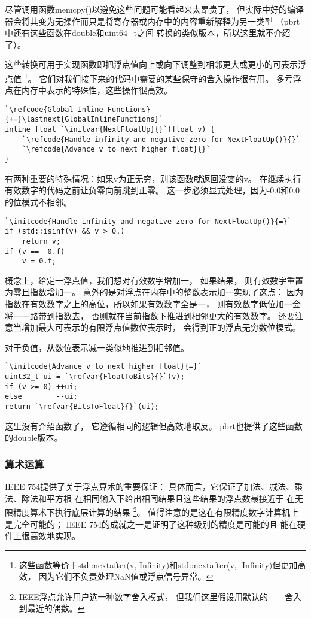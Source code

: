 尽管调用函数{\ttfamily memcpy()}以避免这些问题可能看起来太昂贵了，
但实际中好的编译器会将其变为无操作而只是将寄存器或内存中的内容重新解释为另一类型
（pbrt中还有这些函数在{\ttfamily double}和{\ttfamily uint64\_t}之间
转换的类似版本，所以这里就不介绍了）。

这些转换可用于实现函数即把浮点值向上或向下调整到相邻更大或更小的可表示浮点值
\footnote{这些函数等价于{\ttfamily std::nextafter(v, Infinity)}和{\ttfamily std::nextafter(v, -Infinity)}但更加高效，
因为它们不负责处理NaN值或浮点信号异常。}。
它们对我们接下来的代码中需要的某些保守的舍入操作很有用。
多亏浮点在内存中表示的特殊性，这些操作很高效。
\begin{lstlisting}
`\refcode{Global Inline Functions}{+=}\lastnext{GlobalInlineFunctions}`
inline float `\initvar{NextFloatUp}{}`(float v) {
    `\refcode{Handle infinity and negative zero for NextFloatUp()}{}`
    `\refcode{Advance v to next higher float}{}`
}
\end{lstlisting}

有两种重要的特殊情况：如果{\ttfamily v}为正无穷，则该函数就返回没变的{\ttfamily v}。
在继续执行有效数字的代码之前让负零向前跳到正零。
这一步必须显式处理，因为-0.0和0.0的位模式不相邻。
\begin{lstlisting}
`\initcode{Handle infinity and negative zero for NextFloatUp()}{=}`
if (std::isinf(v) && v > 0.)
    return v;
if (v == -0.f)
    v = 0.f;
\end{lstlisting}

概念上，给定一浮点值，我们想对有效数字增加一，
如果结果，
则有效数字重置为零且指数增加一。
意外的是对浮点在内存中的整数表示加一实现了这点：
因为指数在有效数字之上的高位，所以如果有效数字全是一，
则有效数字低位加一会将一一路带到指数去，
否则就在当前指数下推进到相邻更大的有效数字。
还要注意当增加最大可表示的有限浮点值数位表示时，
会得到正的浮点无穷数位模式。

对于负值，从数位表示减一类似地推进到相邻值。
\begin{lstlisting}
`\initcode{Advance v to next higher float}{=}`
uint32_t ui = `\refvar{FloatToBits}{}`(v);
if (v >= 0) ++ui;
else        --ui;
return `\refvar{BitsToFloat}{}`(ui);
\end{lstlisting}

这里没有介绍函数{}了，
它遵循相同的逻辑但高效地取反。
pbrt也提供了这些函数的{\ttfamily double}版本。

\subsubsection*{算术运算}
IEEE 754提供了关于浮点算术的重要保证：
具体而言，它保证了加法、减法、乘法、除法和平方根
在相同输入下给出相同结果且这些结果的浮点数最接近于
在无限精度算术下执行底层计算的结果
\footnote{IEEE浮点允许用户选一种数字舍入模式，
    但我们这里假设用默认的——舍入到最近的偶数。}。
值得注意的是这在有限精度数字计算机上是完全可能的；
IEEE 754的成就之一是证明了这种级别的精度是可能的且
能在硬件上很高效地实现。

